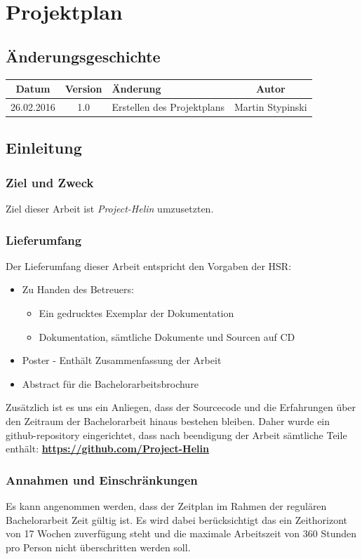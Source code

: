 \chapter{Projektplan}
\section{Änderungsgeschichte}
\begin{tabularx}{\textwidth}{|c|c|X|c|}
  \hline
  \textbf{Datum} & \textbf{Version} & \textbf{Änderung} & \textbf{Autor} \\
  \hline \hline
  26.02.2016 & 1.0 & Erstellen des Projektplans & Martin Stypinski \\
  \hline
\end{tabularx}

\section{Einleitung}
\subsection{Ziel und Zweck}
Ziel dieser Arbeit ist \textit{Project-Helin} umzusetzten. 

\subsection{Lieferumfang}
Der Lieferumfang dieser Arbeit entspricht den Vorgaben der HSR:
\begin{itemize}
	\item{Zu Handen des Betreuers:
	\begin{itemize}
		\item{Ein gedrucktes Exemplar der Dokumentation}
		\item{Dokumentation, sämtliche Dokumente und Sourcen auf CD}
	\end{itemize}}
	\item{Poster - Enthält Zusammenfassung der Arbeit}
	\item{Abstract für die Bachelorarbeitsbrochure}
\end{itemize}
Zusätzlich ist es uns ein Anliegen, dass der Sourcecode und die Erfahrungen über den Zeitraum der Bachelorarbeit hinaus bestehen bleiben. Daher wurde ein github-repository eingerichtet, dass nach beendigung der Arbeit sämtliche Teile enthält: \textbf{\url{https://github.com/Project-Helin}}

\subsection{Annahmen und Einschränkungen}
Es kann angenommen werden, dass der Zeitplan im Rahmen der regulären Bachelorarbeit Zeit gültig ist. Es wird dabei berücksichtigt das ein Zeithorizont von 17 Wochen zuverfügung steht und die maximale Arbeitszeit von 360 Stunden pro Person nicht überschritten werden soll.

